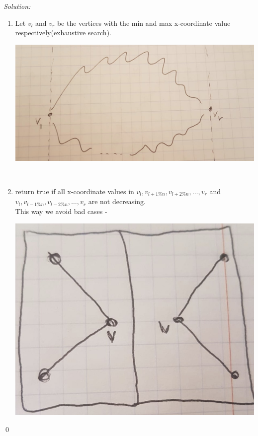 \documentclass[a4paper, 8pt, oneside]{article}
\newenvironment{sol}
    {\emph{Solution:}
    }
    {
    \qed
    }
\begin{document}
\begin{enumerate}
\begin{sol}
 \begin{enumerate}
   \item  \label{itm:setp1}  Let $v_l$ and $v_r$ be the  vertices with the min and max  x-coordinate value  respectively(exhaustive search).\\
         \begin{minipage}{\linewidth}
            \centering
            \includegraphics[scale=0.2]{chanis}
        \end{minipage} \\
\item \label{itm:setp2} return true if all  x-coordinate values in  $v_l, v_{l+1\%n}, v_{l+2\%n}, \ldots, v_r$ and $v_l, v_{l-1\%n}, v_{l-2\%n}, \ldots, v_r$ are not decreasing.\\
This way we avoid bad cases -\\
      \begin{minipage}{\linewidth}
            \centering
            \includegraphics[scale=0.2]{ver}

\end{minipage}
\end{enumerate}
\end{sol}
\end{enumerate}
\end{document}
